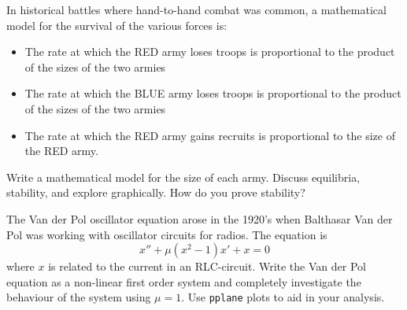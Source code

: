 \begin{problem}
    In historical battles where hand-to-hand combat was common, a mathematical model
    for the survival of the various forces is:
    \begin{itemize}
        \item The rate at which the {\color{red} RED} army loses troops is
            proportional to the product of the sizes of the two armies
        \item The rate at which the {\color{blue} BLUE} army loses troops is
            proportional to the product of the sizes of the two armies
        \item The rate at which the {\color{red} RED} army gains recruits is
            proportional to the size of the {\color{red} RED} army.
    \end{itemize}
    Write a mathematical model for the size of each army.  Discuss equilibria, stability,
    and explore graphically. How do you prove stability?
\end{problem}
    \solution{
        \[ \left\{ \begin{array}{ll} R' &= -\alpha RB + \kappa R \\ B' &= -\beta RB \end{array} \right. \]

    }


\begin{problem}
    The Van der Pol oscillator equation arose in the 1920's when Balthasar Van der Pol was
    working with oscillator circuits for radios.  The equation is
    \[ x'' + \mu (x^2-1) x' + x = 0 \]
    where $x$ is related to the current in an RLC-circuit.  Write the Van der Pol equation
    as a non-linear first order system and completely investigate the behaviour of the system using
    $\mu = 1$.  Use \texttt{pplane} plots to aid in your analysis.
\end{problem}

